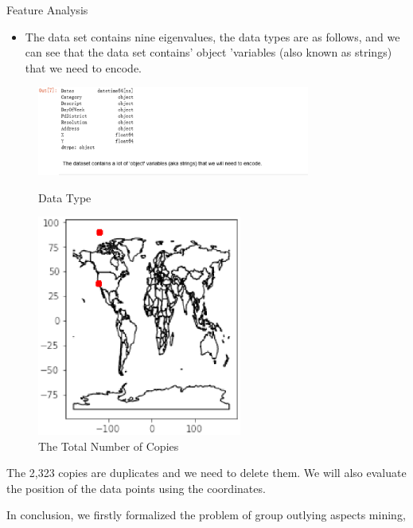 \documentclass[
 size=14pt,
 paper=smartboard,  %
 mode=present, 		%
 display=slides, 	%
 style=tuliplab,  	%
 pauseslide,
 fleqn,leqno]{powerdot}
\begin{document}
\begin{slide}[toc=,bm=]{Feature Analysis}
\begin{itemize}
\item The data set contains nine eigenvalues, the data types are as follows,
 and we can see that the data set contains' object 'variables (also known as strings) 
 that we need to encode.

\end{itemize}

\begin{figure}[htbp]
  \centering
  \begin{minipage}[t]{0.48\textwidth}
    \centering
    \includegraphics[width=0.8\textwidth]{kaggle/3.eps}
    \vspace{0.4em}
    \caption{ Data Type}
  \end{minipage}
  \begin{minipage}[t]{0.48\textwidth}
    \centering
    \includegraphics[width=0.6\textwidth]{kaggle/5.eps}
    \vspace{0.4em}
    \caption{The Total Number of Copies}
  \end{minipage}
\end{figure}

The 2,323 copies are duplicates and we need to delete them.
We will also evaluate the position of the data points using the coordinates.
\begin{note}
In conclusion,
we firstly formalized the problem of
group outlying aspects mining,


\end{note}
\end{slide}
\end{document}
